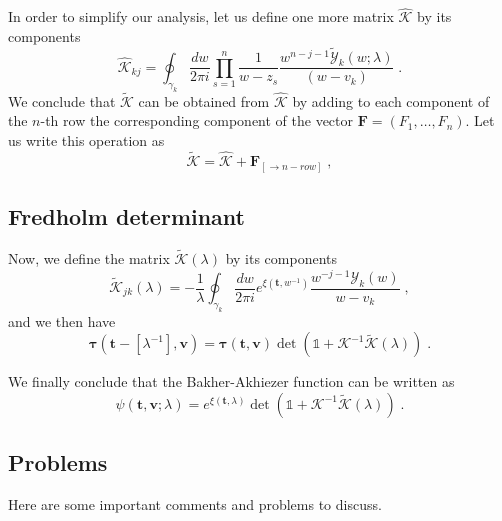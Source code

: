 \documentclass[a4paper,11pt]{amsart}
\begin{document}
In order to simplify our analysis, let us define one more matrix
\(\widehat{\mathcal{K}}\) by its components
\begin{equation}
    \widehat{\mathcal{K}}_{kj} = 
    \oint_{\gamma_k} \frac{dw}{2\pi i} \prod_{s=1}^n \frac{1}{w - z_s}
    \frac{w^{n-j-1}\widetilde{\mathcal{Y}}_k(w; \lambda)}{(w - v_k)}\; .
\end{equation}
We conclude that \(\widetilde{\mathcal{K}}\) can be obtained from 
\(\widehat{\mathcal{K}}\) by adding to each component of the \(n\)-th row
the corresponding component of the vector \(\bm{F} = (F_1, \dots , F_n)\). 
Let us write this operation as 
\begin{equation}
  \widetilde{\mathcal{K}} = \widehat{\mathcal{K}} + \bm{F}_{[\rightarrow n-row]}\; ,
\end{equation}







\subsection{Fredholm determinant}

Now, we define the matrix \(\widetilde{\mathcal{K}}(\lambda)\) by its components
\begin{equation}
    \widetilde{\mathcal{K}}_{jk}(\lambda)  = -  \frac{1}{\lambda} 
  \oint_{\gamma_k} \frac{dw}{2\pi i} e^{\xi(\bm{t}, w^{- 1})} \frac{w^{-j -1 }\mathcal{Y}_k(w)}{w - v_k} \; ,
\end{equation}
and we then have 
\begin{equation}
  \bm{\tau}(\bm{t} - [\lambda^{-1}], \bm{v}) =
  \bm{\tau}(\bm{t}, \bm{v})
  \det \left( \mathbb{1} +  \mathcal{K}^{-1} \widetilde{\mathcal{K}}(\lambda) \right)\; .
\end{equation}

We finally conclude that the Bakher-Akhiezer function can be written as
\begin{equation}
  \psi(\bm{t},\bm{v}; \lambda) = e^{\xi(\bm{t}, \lambda)}
  \det \left( \mathbb{1} +  \mathcal{K}^{-1} \widetilde{\mathcal{K}}(\lambda) \right)\; .
\end{equation}








\subsection{Problems}
Here are some important comments and problems to discuss. 
\end{document}
